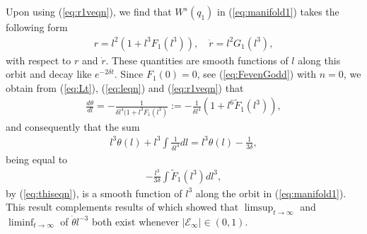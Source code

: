 \documentclass[reqno,12pt]{amsart}
\newcommand{\eqlab}[1]{\label{eq:#1}}
\renewcommand{\eqref}[1]{(\ref{eq:#1})}
\newcommand{\corlab}[1]{\label{cor:#1}}
\newtheorem{cor}[theorem]{Corollary}
\numberwithin{equation}{section}
\begin{document}
Upon using \eqref{r1veqn}, we find that $W^s(q_1)$ in \eqref{manifold1} takes the following form
\begin{align*}
 r = l^2 (1+l^3 F_1(l^3)),\quad \dot r  = l^2 G_1(l^3),
\end{align*}
with respect to $r$ and $\dot r$. These quantities are smooth functions of $l$ along this orbit and decay like $e^{-2\delta t}$. Since $F_1(0)=0$, see \eqref{FevenGodd} with $n=0$, we obtain from \eqref{Lt}, \eqref{leqn} and \eqref{r1veqn} that
\begin{align}
\frac{d\theta}{dl} = -\frac{1}{\delta l^4(1+l^3 F_1(l^3)}:= -\frac{1}{\delta l^4} \left(1+l^6 \widetilde F_1(l^3)\right),\eqlab{thiseqn}
\end{align}
and consequently that the sum
\begin{align*}
l^3 \theta(l) +l^3 \int \frac{1}{\delta l^4} dl = l^3 \theta(l)-\frac{1}{3\delta},
\end{align*}
being equal to
\begin{align*}
 -\frac{l^3}{3\delta} \int \widetilde F_1(l^3) dl^3,
\end{align*}
by \eqref{thiseqn},
is a smooth function of $l^3$ along the orbit in \eqref{manifold1}. This result complements results of \cite[Eq. (43)]{margheri2017a} which showed that $\limsup_{t\rightarrow \infty}$ and $\liminf_{t\rightarrow \infty}$ of $\dot \theta l^{-3}$ both exist whenever $\vert \mathcal E_\infty \vert \in (0,1)$.

% 
\end{document}
